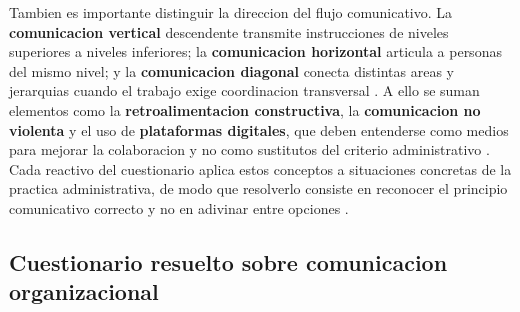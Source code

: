 \documentclass[
	spanish,
	letterpaper, oneside
]{article}
\begin{document}
Tambien es importante distinguir la direccion del flujo comunicativo. La \textbf{comunicacion vertical} descendente transmite instrucciones de niveles superiores a niveles inferiores; la \textbf{comunicacion horizontal} articula a personas del mismo nivel; y la \textbf{comunicacion diagonal} conecta distintas areas y jerarquias cuando el trabajo exige coordinacion transversal \citep{koontz2012administracion}. A ello se suman elementos como la \textbf{retroalimentacion constructiva}, la \textbf{comunicacion no violenta} y el uso de \textbf{plataformas digitales}, que deben entenderse como medios para mejorar la colaboracion y no como sustitutos del criterio administrativo \citep{robbins2017administracion}. Cada reactivo del cuestionario aplica estos conceptos a situaciones concretas de la practica administrativa, de modo que resolverlo consiste en reconocer el principio comunicativo correcto y no en adivinar entre opciones \citep{unadm100TecnicasDidacticas2023}.


\subsection{Cuestionario resuelto sobre comunicacion organizacional}
\end{document}
